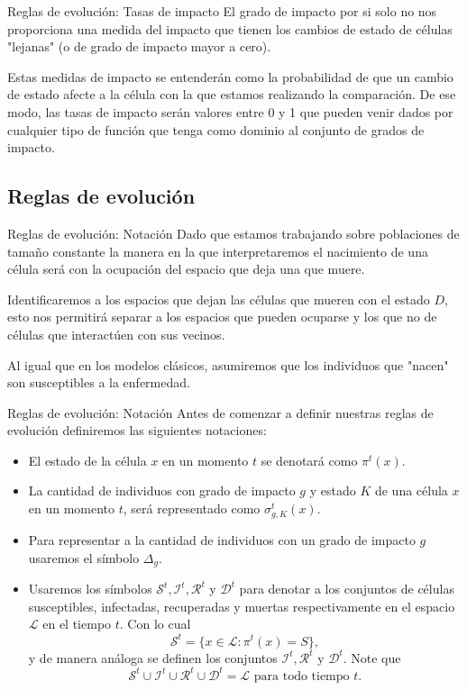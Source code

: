 \documentclass[9pt]{beamer}
\begin{document}
\begin{frame}{Reglas de evolución: Tasas de impacto}
El grado de impacto por si solo no nos proporciona una medida del impacto que tienen los cambios de estado de células "lejanas" (o de grado de impacto mayor a cero). 

Estas medidas de impacto se entenderán como la probabilidad de que un cambio de estado afecte a la célula con la que estamos realizando la comparación. De ese modo, las tasas de impacto serán valores entre 0 y 1 que pueden venir dados por cualquier tipo de función que tenga como dominio al conjunto de grados de impacto.
\end{frame}

\subsection{Reglas de evolución}

\begin{frame}{Reglas de evolución: Notación}
Dado que estamos trabajando sobre poblaciones de tamaño constante la manera en la que interpretaremos el nacimiento de una célula será con la ocupación del espacio que deja una que muere. 

Identificaremos a los espacios que dejan las células que mueren con el estado $D$, esto nos permitirá separar a los espacios que pueden ocuparse y los que no de células que interactúen con sus vecinos. 

Al igual que en los modelos clásicos, asumiremos que los individuos que "nacen" son susceptibles a la enfermedad.
\end{frame}

\begin{frame}{Reglas de evolución: Notación}
Antes de comenzar a definir nuestras reglas de evolución definiremos las siguientes notaciones:
\begin{itemize}
    \item El estado de la célula $x$ en un momento $t$ se denotará como $\pi^t(x)$.
    \item La cantidad de individuos con grado de impacto $g$ y estado $K$ de una célula $x$ en un momento $t$, será representado como $\sigma_{g,K}^t(x)$.
    \item Para representar a la cantidad de individuos con un grado de impacto $g$ usaremos el símbolo $\Delta_g$. 
    \item Usaremos los símbolos $\mathcal{S}^t,\mathcal{I}^t,\mathcal{R}^t$ y $\mathcal{D}^t$ para denotar a los conjuntos de células susceptibles, infectadas, recuperadas y muertas respectivamente en el espacio $\mathcal{L}$ en el tiempo $t$. Con lo cual
    $$\mathcal{S}^t=\{x\in\mathcal{L}:\pi^t(x)=S\},$$
    y de manera análoga se definen los conjuntos $\mathcal{I}^t,\mathcal{R}^t$ y $\mathcal{D}^t$. Note que $$\mathcal{S}^t\cup\mathcal{I}^t\cup\mathcal{R}^t\cup\mathcal{D}^t=\mathcal{L}\text{ para todo tiempo }t.$$
\end{itemize}
\end{frame}
\end{document}
